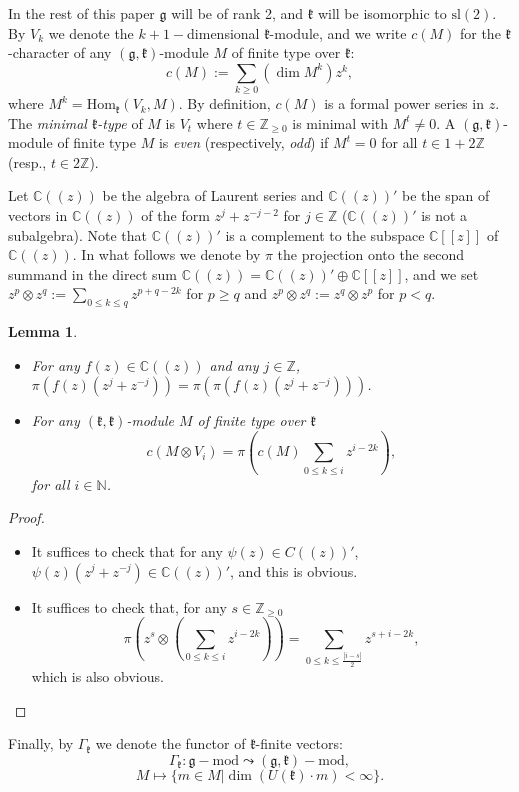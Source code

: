 \documentclass[12pt]{amsart}
\theoremstyle{plain} %
\newtheorem{lemma}[definition]{Lemma}
\newcommand{\Hom}{\mathrm{Hom}}
\renewcommand{\sl}{\mathrm{sl}}
\newcommand {\ZZ} {\mathbb {Z}}
\newcommand {\CC} {\mathbb {C}}
\newcommand {\NN} {\mathbb {N}}
\newcommand{\kk}{\mathfrak{k}}
\renewcommand{\gg}{\mathfrak{g}}
\begin{document}
In the rest of this paper $\gg$ will be of rank 2, and $\kk$ will be isomorphic to $\sl(2)$. By $V_k$ we denote the $k+1-$dimensional $\kk$-module, and we write $c(M)$ for the $\kk$-character of any  $(\gg,\kk)$-module $M$ of finite type over $\kk$:
\[
c(M):=\sum_{k\geq 0} (\dim M^k)z^k,
\]
where $M^k=\Hom_\kk(V_k,M)$.
By definition, $c(M)$ is a formal power series in $z$. The
\emph{minimal $\kk$-type} of $M$ is $V_t$ where $t\in\ZZ_{\geq 0}$ is
minimal with $M^t\neq 0$. A $(\gg,\kk)$-module of finite type $M$ is
\emph{even} (respectively, \emph{odd}) if $M^t=0$ for all $t\in 1+2\ZZ$ (resp., $t\in 2\ZZ$).

Let $\CC((z))$ be the algebra of Laurent series and $\CC ((z))'$ be the span of vectors in $\CC((z))$ of the form $z^j+z^{-j-2}$ for $j\in\ZZ$ ($\CC((z))'$ is not a subalgebra). Note that $\CC((z))'$ is a complement to the subspace $\CC[[z]]$ of $\CC((z))$. In what follows we denote by $\pi$ the projection onto the second summand in the direct sum $\CC((z))=\CC((z))'\oplus\CC[[z]]$, and we set $z^p\otimes z^q:=\sum_{0\leq k\leq q}z^{p+q-2k}$ for $p\geq q$ and $z^p\otimes z^q:=z^q\otimes z^p$ for $p<q$.

\begin {lemma}\label{le202}~
\begin{itemize}
\item[(a)] For any $f(z)\in \CC((z))$ and any $j\in \ZZ$,  $\pi(f(z)(z^j+z^{-j}))=\pi(\pi(f(z)(z^j+z^{-j})))$.
\item[(b)] For any $(\kk,\kk)$-module $M$ of finite type over $\kk$
\[
c(M\otimes V_i)=\pi(c(M)\sum_{0\leq k\leq i}z^{i-2k}),
\]
for all $i\in \NN$.
\end{itemize}
\end{lemma}
\begin {proof}~
\begin {itemize}
\item [(a)] It suffices to check that for any $\psi(z)\in C((z))'$, $\psi(z)(z^j+z^{-j})\in \CC((z))'$, and this is obvious.
\item [(b)] It suffices to check that, for any $s\in \ZZ_{\geq 0}$
\[
\pi(z^s\otimes(\sum_{0\leq k\leq i}z^{i-2k}))=\sum_{0\leq k\leq \frac{|i-s|}{2}}z^{s+i-2k},
\]
which is also obvious.
\end{itemize}
\end{proof}

Finally, by $\Gamma_\kk$ we denote the functor of $\kk$-finite vectors:
\[
\Gamma_\kk:\gg-\text{mod}\leadsto(\gg,\kk)-\text{mod},
\]
\[
M\mapsto\{m\in M|\dim(U(\kk)\cdot m)<\infty\}.
\]
\end{document}

